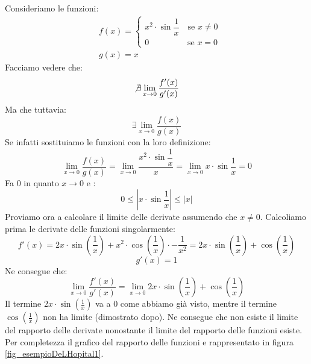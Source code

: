 \begin{itemize}
		Consideriamo le funzioni:
		\begin{align*}
			&f(x) = 
			\begin{cases*}
				x^2 \cdot \sin{\dfrac{1}{x}} \quad \text{se } x \neq 0\\
				0 \qquad \qquad \;\; \text{se } x = 0
			\end{cases*}\\[10pt]
			&g(x) = x
		\end{align*}
		Facciamo vedere che:
		\begin{equation*}
			\not \exists \lim_{x \to 0} \dfrac{f'(x)}{g'(x)}
		\end{equation*}
		Ma che tuttavia:
		\begin{equation*}
			\exists \lim_{x \to 0} \dfrac{f(x)}{g(x)}
		\end{equation*}
		Se infatti sostituiamo le funzioni con la loro definizione:
		\begin{equation*}
			\lim_{x \to 0} \dfrac{f(x)}{g(x)} = \lim_{x \to 0} \dfrac{x^2 \cdot 
            \sin{\dfrac{1}{x}}}{x} = \lim_{x \to 0} x \cdot \sin{\dfrac{1}{x}} 
            = 0
		\end{equation*}
		Fa 0 in quanto $x \to 0$ e :
		\begin{equation*}
			0 \leq \left| x \cdot \sin{\dfrac{1}{x}} \right| \leq |x|
		\end{equation*}
		Proviamo ora a calcolare il limite delle derivate assumendo che $x 
        \neq 0$. Calcoliamo prima le derivate delle funzioni singolarmente:
		\begin{equation*}
			f'(x) = 2x \cdot \sin \left(\dfrac{1}{x} \right) + x^2 \cdot \cos 
            \left(\dfrac{1}{x} \right) \cdot -\dfrac{1}{x^2} = 2x \cdot \sin 
            \left(\dfrac{1}{x} \right) + \cos \left(\dfrac{1}{x} \right) 
		\end{equation*}
		\begin{equation*}
			g'(x) = 1
		\end{equation*}
		Ne consegue che:
		\begin{equation*}
			\lim_{x \to 0} \dfrac{f'(x)}{g'(x)} = \lim_{x \to 0} 2x \cdot \sin 
            \left(\dfrac{1}{x} \right) + \cos \left(\dfrac{1}{x} \right) 
		\end{equation*}
		Il termine $2x \cdot \sin \left(\frac{1}{x} \right)$ va a 0 come 
        abbiamo già visto, mentre il termine $\cos \left(\frac{1}{x} \right)$ 
        non ha limite (dimostrato dopo). Ne consegue che non esiste il limite 
        del rapporto delle derivate nonostante il limite del rapporto delle 
        funzioni esiste. Per completezza il grafico del rapporto delle funzioni 
        e rappresentato in figura \ref{fig_esempioDeLHopital1}.


\end{itemize}
